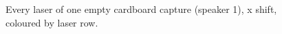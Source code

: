 \begin{figure}[t]
\centering

\caption{Every laser of one empty cardboard capture (speaker 1), x shift, coloured by laser row.}
\label{fig:lasers_one_capture_x}
\end{figure}
